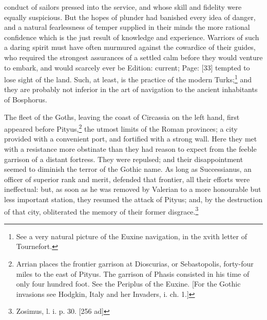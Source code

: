 conduct of sailors pressed into the service, and whose skill and fidelity were equally suspicious. But the hopes of plunder had banished every idea of danger, and a natural fearlessness of temper supplied in their minds the more rational confidence which is the just result of knowledge and experience. Warriors of such a daring spirit must have often murmured against the cowardice of their guides, who required the strongest assurances of a settled calm before they would venture to embark, and would scarcely ever be Edition: current; Page: [33] tempted to lose sight of the land. Such, at least, is the practice of the modern Turks;\footnote{See a very natural picture of the Euxine navigation, in the xvith letter of Tournefort.} and they are probably not inferior in the art of navigation to the ancient inhabitants of Bosphorus.

The fleet of the Goths, leaving the coast of Circassia on the left hand, first appeared before Pityus,\footnote{Arrian places the frontier garrison at Dioscurias, or Sebastopolis, forty-four miles to the east of Pityus. The garrison of Phasis consisted in his time of only four hundred foot. See the Periplus of the Euxine. [For the Gothic invasions see Hodgkin, Italy and her Invaders, i. ch. 1.]} the utmost limits of the Roman provinces; a city provided with a convenient port, and fortified with a strong wall. Here they met with a resistance more obstinate than they had reason to expect from the feeble garrison of a distant fortress. They were repulsed; and their disappointment seemed to diminish the terror of the Gothic name. As long as Successianus, an officer of superior rank and merit, defended that frontier, all their efforts were ineffectual: but, as soon as he was removed by Valerian to a more honourable but less important station, they resumed the attack of Pityus; and, by the destruction of that city, obliterated the memory of their former disgrace.\footnote{Zosimus, l. i. p. 30. [256 ad]}

